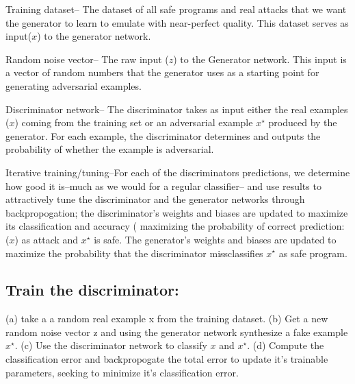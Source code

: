 Training dataset-- The dataset of all safe programs and real attacks that we want the generator to learn to emulate with near-perfect quality. This dataset serves as input($x$) to the generator network. 

Random noise vector-- The raw input ($z$) to the Generator network. This input is a vector of random numbers that the generator uses as a starting point for generating adversarial examples. 

Discriminator network-- The discriminator takes as input either the real examples ($x$) coming from the training set or an adversarial example $x^{\star}$ produced by the generator. For each example, the discriminator determines and outputs the probability of whether the example is adversarial.

Iterative training/tuning--For each of the discriminators predictions, we determine how good it is--much as we would for a regular classifier-- and use results to attractively tune the discriminator and the generator networks through backpropogation; the discriminator's weights and biases are updated to maximize its classification and accuracy ( maximizing the probability of correct prediction: ($x$) as attack and $x^{\star}$ is safe. 
The generator's weights and biases are updated to maximize the probability that the discriminator missclassifies $x^{\star}$ as safe program.  
 
 
 
 
 
 
 
 
 






\subsection{Train the discriminator:}
(a) take a a random real example x from the training dataset. (b) Get a new random noise vector z and using the generator network synthesize a fake example  $x^{\star}$. (c) Use the discriminator network to classify  $x$ and  $x^{\star}$. (d) Compute the classification error and backpropogate the total error to update it's trainable parameters, seeking to minimize it's classification error. 

